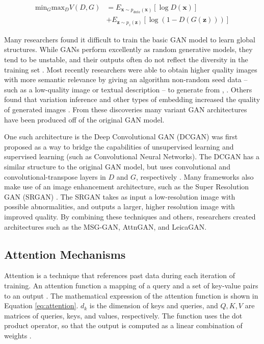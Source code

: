 \documentclass[letterpaper]{article} %
\begin{document}
\begin{equation}
\label{eq:gan_basic}
\begin{split}
\text{min}_G\text{max}_DV(D,G) &=
E_{\mathbf{x}\sim p_{data}(\mathbf{x})}[\log D(\mathbf{x})] \\
&+ E_{\mathbf{z}\sim p_{z}(\mathbf{z})}[\log(1 - D(G(\mathbf{z})))]
\end{split}
\end{equation}

Many researchers found it difficult to train the basic GAN model to learn 
global  structures.
While GANs perform excellently as random generative models,
they tend to be unstable,
and their outputs often do not reflect the diversity in the training set
\cite{image_transformer}.
Most recently researchers were able to obtain
higher quality images with more semantic relevance by giving
an algorithm non-random seed data
-- such as a low-quality image or textual description -- to generate from
\cite{texture_synthesis}, \cite{multiscale_video}.
Others found that variation inference and other types of embedding 
increased the quality of generated images \cite{varigan}.
From these discoveries many variant GAN architectures have been produced off of 
the original GAN model.

One such architecture is the Deep Convolutional GAN (DCGAN) was first proposed 
as a way to bridge the capabilities of unsupervised learning  and supervised 
learning (such as Convolutional Neural Networks). 
The DCGAN has a similar structure to the original GAN model, but uses 
convolutional and convolutional-transpose layers in $D$ and $G$, respectively
\cite{unsupervised_learning}. Many frameworks also make use of an image 
enhancement architecture, such as the  Super Resolution GAN (SRGAN) 
\cite{srgan}. The SRGAN takes as input a low-resolution image with possible 
abnormalities, and outputs a larger, higher resolution image with improved 
quality. By combining these techniques and others, researchers created 
architectures such as the MSG-GAN, AttnGAN, and LeicaGAN.

\subsection{Attention Mechanisms}
Attention is a technique that references past data during each iteration of 
training. An attention function a mapping of a query and a
set of key-value pairs to an output \cite{attention_need}.
The mathematical expression of the attention function is shown in
Equation \ref{eq:attention}.
$d_k$ is the dimension of keys and queries, and
$Q,K,V$ are matrices of queries, keys, and values, respectively.
The function uses the dot product operator, so that the output is computed as
a linear combination of weights \cite{attention_need}.
\end{document}
